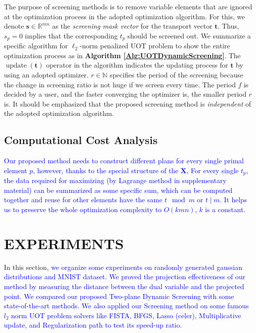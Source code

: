 \documentclass[twoside]{article}
\theoremstyle{plain}
\newcommand{\mat}[1]{\mathbf{#1}}
\renewcommand{\vec}[1]{\bm{#1}}
\newcommand{\changeXS}[1]{\textcolor{blue}{#1}}
\begin{document}
The purpose of screening methods is to remove variable elements that are ignored at the optimization process in the adopted optimization algorithm. For this, we denote $\vec{s} \in \mathbb{R}^{mn}$ as the {\it screening mask vector} for the transport vector $\vec{t}$. Thus, $s_p = 0$ implies that the corresponding $t_p$ should be screened out. We summarize a specific algorithm for $\ell_2$-norm penalized UOT problem to show the entire optimization process as in {\bf Algorithm \ref{Alg:UOTDynamicScreening}}. The $\operatorname{update}(\vec{t})$ operator in the algorithm indicates the updating process for $\vec{t}$ by using an adopted optimizer. $r \in \mathbb{N}$ specifies the period of the screening because the change in screening ratio is not huge if we screen every time. The period $f$ is decided by a user, and the faster converging the optimizer is, the smaller period $r$ is. It should be emphasized that the proposed screening method is {\it independent} of the adopted optimization algorithm. 

\subsection{Computational Cost Analysis}
\changeXS{Our proposed method needs to construct different plans for every single primal element $p$, however, thanks to the special structure of the $\mat X$, For every single $t_p$, the data required for maximizing (by Lagrange method in supplementary material) can be summarized as some specific sum, which can be computed together and reuse for other elements have the same $t \mod m $ or $t \mid m$. It helps us to preserve the whole optimization complexity to $O(kmn)$, $k$ is a constant.}

\section{EXPERIMENTS}
\label{sec:exp}
In this section, \changeXS{we organize some experiments on randomly generated gaussian distributions and MNIST dataset. We proved the projection effectiveness of our method by measuring the distance between the dual variable and the projected point. We compared our proposed Two-plane Dynamic Screening with some state-of-the-art methods. We also applied our Screening method on some famous $l_2$ norm UOT problem solvers like FISTA, BFGS, Lasso (celer), Multiplicative update, and Regularization path to test its speed-up ratio.}
\end{document}
